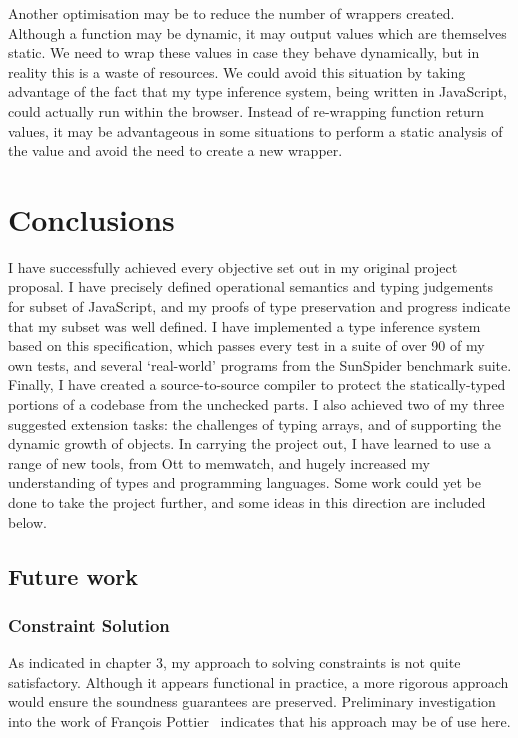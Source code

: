 \documentclass[12pt,a4paper,twoside,openright]{report}
\theoremstyle{definition}
\theoremstyle{dotless}
\begin{document}
Another optimisation may be to reduce the number of wrappers created. Although a
function may be dynamic, it may output values which are themselves static. We need to
wrap these values in case they behave dynamically, but in reality this is a waste of 
resources. We could avoid this situation by taking advantage of the fact that my type inference 
system, being written in JavaScript, could actually run within the browser. Instead of re-wrapping
function return values, it may be advantageous in some situations to perform a static analysis
of the value and avoid the need to create a new wrapper.

\chapter{Conclusions}

I have successfully achieved every objective set out in my original project
proposal.  I have precisely defined operational semantics and typing judgements
for subset of JavaScript, and my proofs of type preservation and progress
indicate that my subset was well defined.  I have implemented a type inference
system based on this specification, which passes every test in a suite of over
90 of my own tests, and several `real-world' programs from the SunSpider
benchmark suite. Finally, I have created a source-to-source compiler to
protect the statically-typed portions of a codebase from the unchecked parts. I
also achieved two of my three suggested extension tasks: the challenges of
typing arrays, and of supporting the dynamic growth of objects. In carrying the
project out, I have learned to use a range of new tools, from Ott to memwatch,
and hugely increased my understanding of types and programming languages. Some
work could yet be done to take the project further, and some ideas in this
direction are included below.

\section{Future work}

\subsection{Constraint Solution}
As indicated in chapter 3, my approach to solving constraints is not quite satisfactory. 
Although it appears functional in practice, a more rigorous approach would ensure the
soundness guarantees are preserved. Preliminary investigation into the work of
Fran\c{c}ois Pottier~\cite{pottier1998type} indicates that his approach may be of use here.
\end{document}
